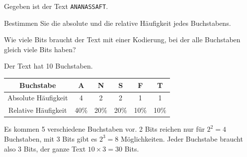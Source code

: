 \begin{myexercise}
\begin{myanswer}
\begin{figure}[H]
		\end{figure}
	\end{myanswer}
\end{myexercise}

\begin{myexercise}\label{ex:haeufigkeiten}
	Gegeben ist der Text \texttt{ANANASSAFT}.
	\begin{aenum}
		\item Bestimmen Sie die absolute und die relative Häufigkeit jedes Buchstabens.
		\item Wie viele Bits braucht der Text mit einer Kodierung, bei der alle Buchstaben gleich viele Bits haben?
	\end{aenum}
	\begin{myanswer}
		\begin{aenum}
			\item Der Text hat 10 Buchstaben.
			      \begin{center}
				      \begin{tabular}{cccccc}
					      Buchstabe           & A    & N    & S    & F    & T    \\\midrule
					      Absolute Häufigkeit & 4    & 2    & 2    & 1    & 1    \\
					      Relative Häufigkeit & 40\% & 20\% & 20\% & 10\% & 10\%
				      \end{tabular}
			      \end{center}
			\item Es kommen 5 verschiedene Buchstaben vor. 2 Bits reichen nur für $2^2=4$ Buchstaben, mit 3 Bits gibt es $2^3=8$ Möglichkeiten. Jeder Buchstabe braucht also 3 Bits, der ganze Text $10\times3=30$ Bits.
		\end{aenum}
	\end{myanswer}
\end{myexercise}

